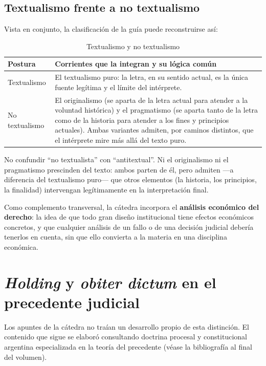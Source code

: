 \documentclass[12pt,oneside]{book}
\begin{document}
\subsection{Textualismo frente a no textualismo}

Vista en conjunto, la clasificación de la guía puede reconstruirse así:

\begin{table}[H]
\centering
\caption{Textualismo y no textualismo}
\begin{tabularx}{\textwidth}{@{}lX@{}}
\toprule
\textbf{Postura} & \textbf{Corrientes que la integran y su lógica común} \\
\midrule
Textualismo & El textualismo puro: la letra, en su sentido actual, es la única
fuente legítima y el límite del intérprete. \\
No textualismo & El originalismo (se aparta de la letra actual para atender a la
voluntad histórica) y el pragmatismo (se aparta tanto de la letra como de la
historia para atender a los fines y principios actuales). Ambas variantes admiten,
por caminos distintos, que el intérprete mire más allá del texto puro. \\
\bottomrule
\end{tabularx}
\end{table}

\begin{impbox}
No confundir ``no textualista'' con ``antitextual''. Ni el originalismo ni el
pragmatismo prescinden del texto: ambos parten de él, pero admiten —a diferencia
del textualismo puro— que otros elementos (la historia, los principios, la
finalidad) intervengan legítimamente en la interpretación final.
\end{impbox}

Como complemento transversal, la cátedra incorpora el \textbf{análisis económico
del derecho}: la idea de que todo gran diseño institucional tiene efectos
económicos concretos, y que cualquier análisis de un fallo o de una decisión
judicial debería tenerlos en cuenta, sin que ello convierta a la materia en una
disciplina económica.

\section{\textit{Holding} y \textit{obiter dictum} en el precedente judicial}

\begin{notebox}
Los apuntes de la cátedra no traían un desarrollo propio de esta distinción. El
contenido que sigue se elaboró consultando doctrina procesal y constitucional
argentina especializada en la teoría del precedente (véase la bibliografía al
final del volumen).
\end{notebox}
\end{document}
